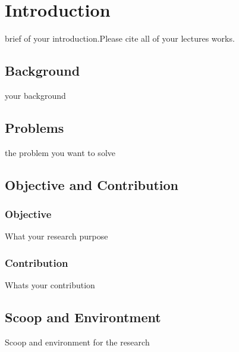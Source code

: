 \chapter{Introduction}

brief of your introduction.Please cite all of your lectures works\cite{pane2018qualitative}\cite{awangga2018k}\cite{Awangga2017}\cite{yulita2017quantization}.

\section{Background}
your background

\section{Problems}
the problem you want to solve

\section{Objective and Contribution}
\subsection{Objective}
What your research purpose

\subsection{Contribution}
Whats your contribution

\section{Scoop and Environtment}
Scoop and environment for the research



